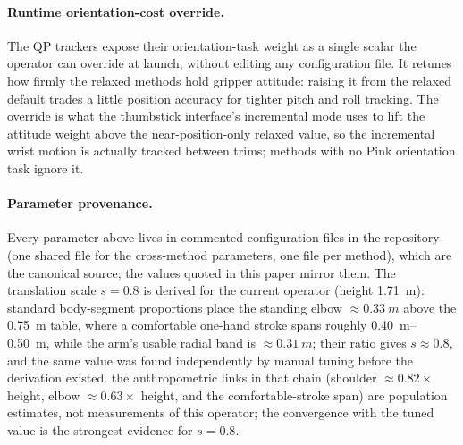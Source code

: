 \paragraph{Runtime orientation-cost override.}
The QP trackers expose their orientation-task weight as a single scalar
the operator can override at launch, without editing any configuration
file. It retunes how firmly the relaxed methods hold gripper attitude:
raising it from the relaxed default trades a little position accuracy for
tighter pitch and roll tracking. The override is what the thumbstick
interface's incremental mode uses to lift the attitude weight above the
near-position-only relaxed value, so the incremental wrist motion is
actually tracked between trims; methods with no Pink orientation task
ignore it.

\paragraph{Parameter provenance.}
Every parameter above lives in commented configuration files in the
repository (one shared file for the cross-method parameters, one file
per method), which are the canonical source; the values quoted in this
paper mirror them. The translation scale \(s=0.8\) is derived for the
current operator (height \SI{1.71}{m}): standard body-segment
proportions place the standing elbow \(\approx\SI{0.33}{m}\) above the
\SI{0.75}{m} table, where a comfortable one-hand stroke spans roughly
\SIrange{0.40}{0.50}{m}, while the arm's usable radial band is
\(\approx\SI{0.31}{m}\); their ratio gives \(s\approx0.8\), and the same
value was found independently by manual tuning before the derivation
existed. \unjustified{} the anthropometric links in that chain
(shoulder \(\approx0.82\times\) height, elbow \(\approx0.63\times\)
height, and the comfortable-stroke span) are population estimates, not
measurements of this operator; the convergence with the tuned value is
the strongest evidence for \(s=0.8\).
